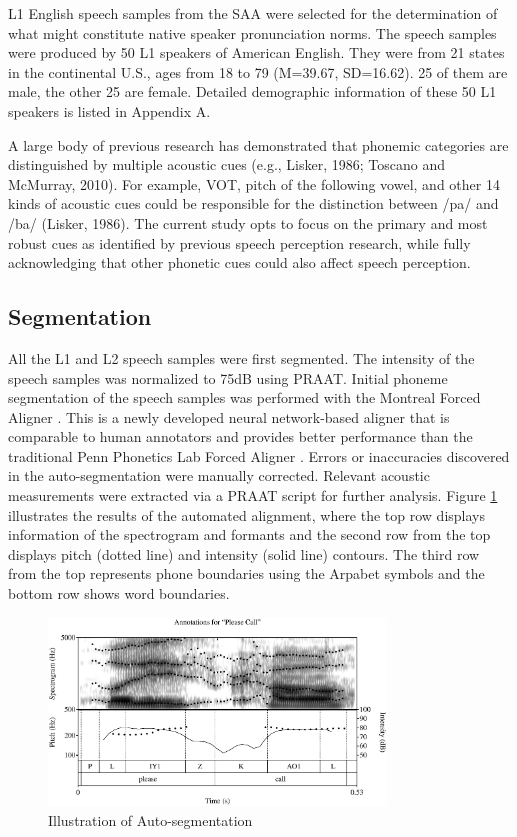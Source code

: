 L1 English speech samples from the SAA were selected for the determination of what might constitute native speaker pronunciation norms. The speech samples were produced by 50 L1 speakers of American English. They were from 21 states in the continental U.S., ages from 18 to 79 (M=39.67, SD=16.62). 25 of them are male, the other 25 are female. Detailed demographic information of these 50 L1 speakers is listed in Appendix A.  

A large body of previous research has demonstrated that phonemic categories are distinguished
by multiple acoustic cues (e.g., Lisker, 1986; Toscano and McMurray, 2010). For example, VOT, pitch of the following vowel, and other 14 kinds of acoustic cues could be responsible for the distinction between /pa/ and /ba/ (Lisker, 1986). The current study opts to focus on the primary and most robust cues as identified by previous speech perception research, while fully acknowledging that other phonetic cues could also affect speech perception.


\subsection{Segmentation}

All the L1 and L2 speech samples were first segmented. The intensity of the speech samples was normalized to 75dB using PRAAT. Initial phoneme segmentation of the speech samples was performed with the Montreal Forced Aligner \citep{McAuliffe_2017}. This is a newly developed neural network-based aligner that is comparable to human annotators and provides better performance than the traditional Penn Phonetics Lab Forced Aligner \citep{Yuan_2008}. Errors or inaccuracies discovered in the auto-segmentation were manually corrected. Relevant acoustic measurements were extracted via a PRAAT script for further analysis. Figure \ref{fig:seg} illustrates the results of the automated alignment, where the top row displays information of the spectrogram and formants and the second row from the top displays pitch (dotted line) and intensity (solid line) contours. The third row from the top represents phone boundaries using the Arpabet symbols and the bottom row shows word boundaries.

\begin{figure}[ht]
  \figSpace
    \centering
	\includegraphics[width=0.8\textwidth]{figures/seg.eps}
    \caption{Illustration of Auto-segmentation}
    \label{fig:seg}
  \figSpace
\end{figure}

